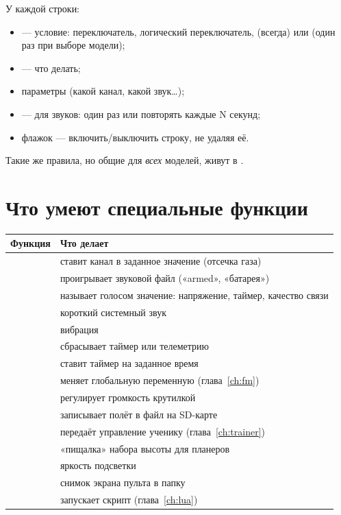 У каждой строки:
\begin{itemize}
  \item {} --- условие: переключатель, логический переключатель, 
        (всегда) или  (один раз при выборе модели);
  \item {} --- что делать;
  \item параметры (какой канал, какой звук…);
  \item {} --- для звуков: один раз или повторять каждые N секунд;
  \item флажок  --- включить/выключить строку, не удаляя её.
\end{itemize}

Такие же правила, но общие для \emph{всех} моделей, живут в .

\section{Что умеют специальные функции}

\begin{center}\small
\renewcommand{\arraystretch}{1.2}
\begin{tabularx}{\linewidth}{@{}L{34mm}Y@{}}
\toprule
\textbf{Функция} & \textbf{Что делает} \\
\midrule
{} & ставит канал в заданное значение (отсечка газа) \\
 & проигрывает звуковой файл («armed», «батарея») \\
 & называет голосом значение: напряжение, таймер, качество связи \\
 & короткий системный звук \\
 & вибрация \\
 & сбрасывает таймер или телеметрию \\
 & ставит таймер на заданное время \\
 & меняет глобальную переменную (глава~\ref{ch:fm}) \\
 & регулирует громкость крутилкой \\
 & записывает полёт в файл на SD-карте \\
 & передаёт управление ученику (глава~\ref{ch:trainer}) \\
 & «пищалка» набора высоты для планеров \\
 & яркость подсветки \\
 & снимок экрана пульта в папку  \\
 & запускает скрипт (глава~\ref{ch:lua}) \\
\bottomrule
\end{tabularx}
\end{center}

